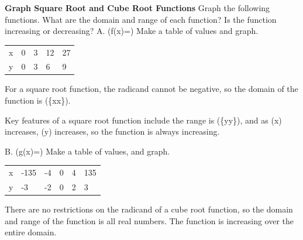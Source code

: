 \documentclass{article}
\newenvironment{example}[1]{}{}         %
\newcommand{\answer}[1]{}               %
\newcommand{\placeholder}[2]{}          %
\newcommand{\te}[1]{}                   %
\begin{document}
\begin{example}{1}
\textbf{Graph Square Root and Cube Root Functions}
Graph the following functions. What are the domain and range of each function? Is the function increasing or decreasing?
A. (f(x)=)
Make a table of values and graph.
\begin{tabular}{lllll}
x & 0 & 3 & 12 & 27 \\
y & 0 & 3 & 6 & 9 \\
\end{tabular}
\te{For ease, choose x-values that make the radicand a perfect square.}
For a square root function, the radicand cannot be negative, so the domain of the function is (\{x\mid x\}).
\placeholder{graph}{Red increasing curve f(x)=sqrt(3x), starting at filled (0,0), with filled points (3,3) and (12,6), and arrow up and right. Axes x,y; horizontal grid every 3, labels 0,6,12,18,24, window 0 to 30; vertical unit grid, labels 0,2,4,6, window 0 to 8. Positive axis arrows; no asymptote.}
\te{Callout: Radical functions do not have a horizontal asymptote; they grow without limit. LOOK FOR RELATIONSHIPS How does the graph of the function shown compare to the graph of its parent function? Powered by desmos.}
Key features of a square root function include the range is (\{y\mid y\}), and as (x) increases, (y) increases, so the function is always increasing.
\answer{A. Domain: (x\geq0); range: (y\geq0); increasing.}
B. (g(x)=)
Make a table of values, and graph.
\begin{tabular}{llllll}
x & -135 & -4 & 0 & 4 & 135 \\
y & -3 & -2 & 0 & 2 & 3 \\
\end{tabular}
\te{Printed table shows -135 and 135; likely -13.5 and 13.5, consistent with (g(x)=\sqrt[3]{2x}) and the graph. Callout: The radicand in a cube root function can be positive or negative. CONTINUED ON THE NEXT PAGE.}
There are no restrictions on the radicand of a cube root function, so the domain and range of the function is all real numbers.
The function is increasing over the entire domain.
\placeholder{graph}{Red g(x)=cube root(2x) through filled points (-13.5,-3),(-4,-2),(0,0),(4,2),(13.5,3), arrowheads both ends. Axes x,y with arrows both ends, x window -16 to 16, grid every 2, labels -12,-8,-4,4,8,12; y window -5 to 5, unit grid, labels -4,-2,2,4, origin O. Increasing curve with vertical tangent at origin.}
\answer{B. Domain and range: all real numbers; increasing over the entire domain.}
\te{LOOK FOR RELATIONSHIPS Odd functions are symmetric about the origin. Even functions are symmetric about the y-axis. Which terms describe the parent functions for square root functions and cube root functions?}
\end{example}
\end{document}

